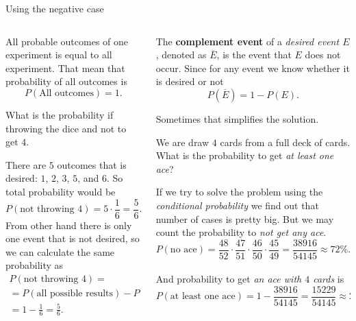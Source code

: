 \documentclass[9pt,aspectratio=169]{beamer}
\begin{document}
\begin{frame}{Using the negative case}
  \begin{columns}[T]
    \begin{column}{0.5\textwidth}
      All probable outcomes of one experiment is equal to all experiment. That mean that probability of all outcomes is 
      \[ P(\text{All outcomes}) = 1. \]
      \vspace*{-1em}
      \begin{problem}
        What is the probability if throwing the dice and not to get $4$. 
      \end{problem}
      There are $5$ outcomes that is desired: $1$, $2$, $3$, $5$, and $6$. So total probability would be 
      \[ P(\text{not throwing $4$}) = 5 \cdot \frac{1}{6} = \frac{5}{6}. \]
      From other hand there is only one event that is not desired, so we can calculate the same probability as
      \begin{multline*} 
        P(\text{not throwing $4$}) = \\
        = P(\text{all possible results}) - P(\text{throwing $4$}) = \\
        = 1 - \frac{1}{6} = \frac{5}{6}.
      \end{multline*}
    \end{column}
    \begin{column}{0.5\textwidth}
      \begin{definition}
        The \textbf{complement event} of a \emph{desired event $E$}, denoted as $\overline{E}$, is the event that $E$ does not occur. Since for any event we know whether it is desired or not
        \[ P(\overline{E}) = 1 - P(E). \]
        \vspace*{-2.5ex} 
      \end{definition}
      Sometimes that simplifies the solution.
      \begin{problem}
        We are draw $4$ cards from a full deck of cards. What is the probability to get \emph{at least one ace}?
      \end{problem}
      If we try to solve the problem using the \emph{conditional probability} we find out that number of cases is pretty big. But we may count the probability to \emph{not get any ace}.
      \[ P (\text{no ace}) = \frac{48}{52} \cdot \frac{47}{51} \cdot \frac{46}{50} \cdot \frac{45}{49} = \frac{38916}{54145} \approx 72\%.\]\\[-1ex]
      And probability to get \emph{an ace with $4$ cards} is
      \[ P (\text{at least one ace}) = 1 - \frac{38916}{54145} = \frac{15229}{54145} \approx 28 \%. \]
    \end{column}
  \end{columns}
\end{frame}
\end{document}
